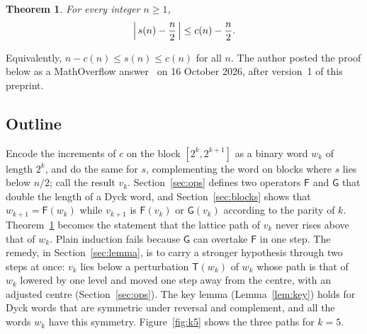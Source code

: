 \documentclass[11pt]{amsart}
\newtheorem{theorem}{Theorem}
\theoremstyle{definition}
\theoremstyle{remark}
\numberwithin{equation}{section}
\newcommand{\cF}{\mathsf F}
\newcommand{\cG}{\mathsf G}
\newcommand{\cT}{\mathsf T}
\begin{document}
\begin{theorem}\label{thm:main}
For every integer $n\ge1$,
\[
\Bigl|\,s(n)-\frac n2\,\Bigr|\le c(n)-\frac n2 .
\]
\end{theorem}

Equivalently, $n-c(n)\le s(n)\le c(n)$ for all $n$. The author posted the proof below as a MathOverflow answer~\cite{Ans} on 16 October 2026, after version~1 of this preprint.

\subsection*{Outline} Encode the increments of $c$ on the block $[2^k,2^{k+1}]$ as a binary word $w_k$ of length $2^k$, and do the same for $s$, complementing the word on blocks where $s$ lies below $n/2$; call the result $v_k$. Section~\ref{sec:ops} defines two operators $\cF$ and $\cG$ that double the length of a Dyck word, and Section~\ref{sec:blocks} shows that $w_{k+1}=\cF(w_k)$ while $v_{k+1}$ is $\cF(v_k)$ or $\cG(v_k)$ according to the parity of $k$. Theorem~\ref{thm:main} becomes the statement that the lattice path of $v_k$ never rises above that of $w_k$. Plain induction fails because $\cG$ can overtake $\cF$ in one step. The remedy, in Section~\ref{sec:lemma}, is to carry a stronger hypothesis through two steps at once: $v_k$ lies below a perturbation $\cT(w_k)$ of $w_k$ whose path is that of $w_k$ lowered by one level and moved one step away from the centre, with an adjusted centre (Section~\ref{sec:ops}). The key lemma (Lemma~\ref{lem:key}) holds for Dyck words that are symmetric under reversal and complement, and all the words $w_k$ have this symmetry. Figure~\ref{fig:k5} shows the three paths for $k=5$.
\end{document}
